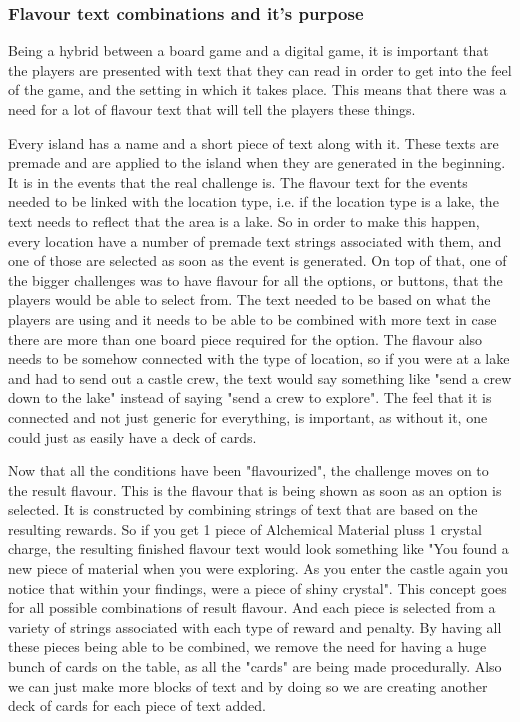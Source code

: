 \subsubsection{Flavour text combinations and it's purpose}
Being a hybrid between a board game and a digital game, it is important that the players are presented with text that they can read in order to get into the feel of the game, and the setting in which it takes place. This means that there was a need for a lot of flavour text that will tell the players these things. 

Every island has a name and a short piece of text along with it. These texts are premade and are applied to the island when they are generated in the beginning. 
It is in the events that the real challenge is. The flavour text for the events needed to be linked with the location type, i.e. if the location type is a lake, the text needs to reflect that the area is a lake. So in order to make this happen, every location have a number of premade text strings associated with them, and one of those are selected as soon as the event is generated. On top of that, one of the bigger challenges was to have flavour for all the options, or buttons, that the players would be able to select from. The text needed to be based on what the players are using and it needs to be able to be combined with more text in case there are more than one board piece required for the option. The flavour also needs to be somehow connected with the type of location, so if you were at a lake and had to send out a castle crew, the text would say something like "send a crew down to the lake" instead of saying "send a crew to explore". The feel that it is connected and not just generic for everything, is important, as without it, one could just as easily have a deck of cards. 

Now that all the conditions have been "flavourized", the challenge moves on to the result flavour. This is the flavour that is being shown as soon as an option is selected. It is constructed by combining strings of text that are based on the resulting rewards. So if you get 1 piece of Alchemical Material pluss 1 crystal charge, the resulting finished flavour text would look something like "You found a new piece of material when you were exploring. As you enter the castle again you notice that within your findings, were a piece of shiny crystal". 
This concept goes for all possible combinations of result flavour. And each piece is selected from a variety of strings associated with each type of reward and penalty. By having all these pieces being able to be combined, we remove the need for having a huge bunch of cards on the table, as all the "cards" are being made procedurally. Also we can just make more blocks of text and by doing so we are creating another deck of cards for each piece of text added.


